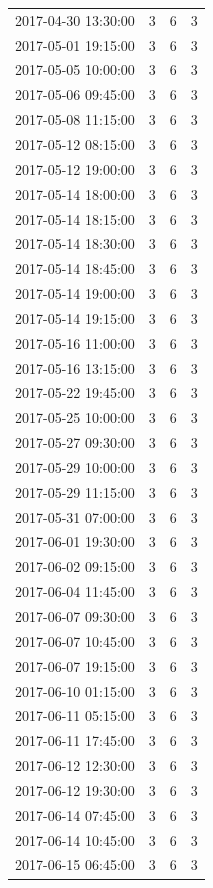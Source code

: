 \begin{tabular}{lrrr}
2017-04-30 13:30:00 & 3 & 6 & 3 \\
2017-05-01 19:15:00 & 3 & 6 & 3 \\
2017-05-05 10:00:00 & 3 & 6 & 3 \\
2017-05-06 09:45:00 & 3 & 6 & 3 \\
2017-05-08 11:15:00 & 3 & 6 & 3 \\
2017-05-12 08:15:00 & 3 & 6 & 3 \\
2017-05-12 19:00:00 & 3 & 6 & 3 \\
2017-05-14 18:00:00 & 3 & 6 & 3 \\
2017-05-14 18:15:00 & 3 & 6 & 3 \\
2017-05-14 18:30:00 & 3 & 6 & 3 \\
2017-05-14 18:45:00 & 3 & 6 & 3 \\
2017-05-14 19:00:00 & 3 & 6 & 3 \\
2017-05-14 19:15:00 & 3 & 6 & 3 \\
2017-05-16 11:00:00 & 3 & 6 & 3 \\
2017-05-16 13:15:00 & 3 & 6 & 3 \\
2017-05-22 19:45:00 & 3 & 6 & 3 \\
2017-05-25 10:00:00 & 3 & 6 & 3 \\
2017-05-27 09:30:00 & 3 & 6 & 3 \\
2017-05-29 10:00:00 & 3 & 6 & 3 \\
2017-05-29 11:15:00 & 3 & 6 & 3 \\
2017-05-31 07:00:00 & 3 & 6 & 3 \\
2017-06-01 19:30:00 & 3 & 6 & 3 \\
2017-06-02 09:15:00 & 3 & 6 & 3 \\
2017-06-04 11:45:00 & 3 & 6 & 3 \\
2017-06-07 09:30:00 & 3 & 6 & 3 \\
2017-06-07 10:45:00 & 3 & 6 & 3 \\
2017-06-07 19:15:00 & 3 & 6 & 3 \\
2017-06-10 01:15:00 & 3 & 6 & 3 \\
2017-06-11 05:15:00 & 3 & 6 & 3 \\
2017-06-11 17:45:00 & 3 & 6 & 3 \\
2017-06-12 12:30:00 & 3 & 6 & 3 \\
2017-06-12 19:30:00 & 3 & 6 & 3 \\
2017-06-14 07:45:00 & 3 & 6 & 3 \\
2017-06-14 10:45:00 & 3 & 6 & 3 \\
2017-06-15 06:45:00 & 3 & 6 & 3 \\

\end{tabular}
